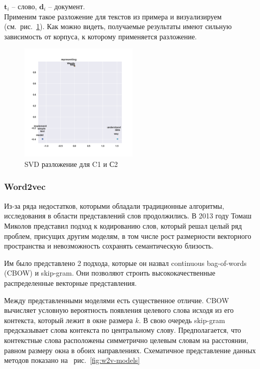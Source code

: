 ${\textbf {t}}_{i}$  -- слово, ${\textbf {d}}_{i}$ -- документ.\\

Применим такое разложение для текстов из примера и визуализируем (см.~рис.~\ref{fig:svd-example}).
Как можно видеть, получаемые результаты имеют сильную зависимость от корпуса, к которому применяется разложение.

\begin{figure}[h]
\centering
\includegraphics[width=0.5\textwidth]{img/svd-example.png}
\caption{\label{fig:svd-example}SVD разложение для C1 и С2}
\end{figure}

\subsubsection{Word2vec}

Из-за ряда недостатков, которыми обладали традиционные алгоритмы, исследования в области представлений слов продолжились. В 2013 году Томаш Миколов представил подход \autocite{DBLP:journals/corr/abs-1301-3781} к кодированию слов, который решал целый ряд проблем, присущих другим моделям, в том числе рост размерности векторного пространства и невозможность сохранять семантическую близость.

Им было представлено 2 подхода, которые он назвал continuous bag-of-words (CBOW) и skip-gram. Они позволяют строить высококачественные распределенные векторные представления.

Между представленными моделями есть существенное отличие. CBOW вычисляет условную вероятность появления целевого слова исходя из его контекста,  который лежит в окне размера $k$. В свою очередь skip-gram предсказывает слова контекста по центральному слову. Предполагается, что контекстные слова расположены симметрично целевым словам на расстоянии, равном размеру окна в обоих направлениях. Схематичное представление данных методов показано на ~рис.~\ref{fig:w2v-models}

